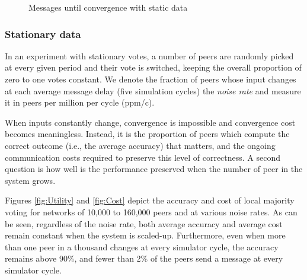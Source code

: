 \documentclass[12pt,english,journal]{elsarticle}
\numberwithin{equation}{section}
\numberwithin{figure}{section}
\theoremstyle{plain}
\theoremstyle{plain}
\begin{document}
\begin{figure*}[p]
\caption{\label{fig:Convergence-with-static}Messages until convergence with
static data}


\begin{minipage}[t]{0.5\textwidth}\end{minipage}\begin{minipage}[t]{0.5\textwidth}\end{minipage}
\end{figure*}





\subsubsection{Stationary data}

In an experiment with stationary votes, a number of peers are randomly
picked at every given period and their vote is switched, keeping the
overall proportion of zero to one votes constant. We denote the fraction
of peers whose input changes at each average message delay (five simulation
cycles) the \emph{noise rate} and measure it in peers per million
per cycle (ppm/c). 

When inputs constantly change, convergence is impossible and convergence
cost becomes meaningless. Instead, it is the proportion of peers which
compute the correct outcome (i.e., the average accuracy) that matters,
and the ongoing communication costs required to preserve this level
of correctness. A second question is how well is the performance preserved
when the number of peer in the system grows.

Figures \ref{fig:Utility} and \ref{fig:Cost} depict the accuracy
and cost of local majority voting for networks of 10,000 to 160,000
peers and at various noise rates. As can be seen, regardless of the
noise rate, both average accuracy and average cost remain constant
when the system is scaled-up. Furthermore, even when more than one
peer in a thousand changes at every simulator cycle, the accuracy
remains above 90\%, and fewer than 2\% of the peers send a message
at every simulator cycle. 
\end{document}
